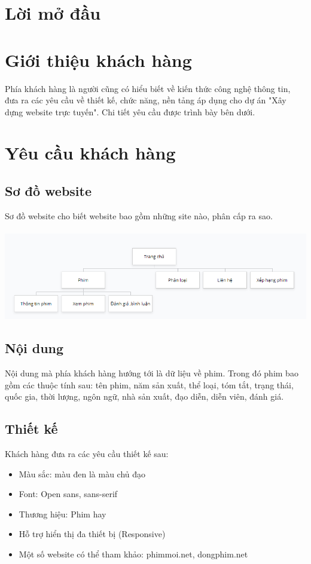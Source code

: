 \documentclass[a4paper]{book}
\begin{document}
\chapter*{Lời mở đầu}
\chapter{Giới thiệu khách hàng}
Phía khách hàng là người cũng có hiểu biết về kiến thức công nghệ thông tin, đưa ra các yêu cầu về thiết kế, chức năng, nền tảng áp dụng cho dự án "Xây dựng website trực tuyến". Chi tiết yêu cầu được trình bày bên dưới.
\chapter{Yêu cầu khách hàng}
\section{Sơ đồ website}
Sơ đồ website cho biết website bao gồm những site nào, phân cấp ra sao.\\ \\
\includegraphics[scale=0.6]{sodo_website.PNG}
\section{Nội dung}
Nội dung mà phía khách hàng hướng tới là dữ liệu về phim. Trong đó phim bao gồm các thuộc tính sau: tên phim, năm sản xuất, thể loại, tóm tắt, trạng thái, quốc gia, thời lượng, ngôn ngữ, nhà sản xuất, đạo diễn, diễn viên, đánh giá.
\section{Thiết kế}
Khách hàng đưa ra các yêu cầu thiết kế sau:
\begin{itemize}
	\item Màu sắc: màu đen là màu chủ đạo
	\item Font: Open sans, sans-serif
	\item Thương hiệu: Phim hay
	\item Hỗ trợ hiển thị đa thiết bị (Responsive)
	\item Một số website có thể tham khảo: phimmoi.net, dongphim.net
\end{itemize}
\end{document}
